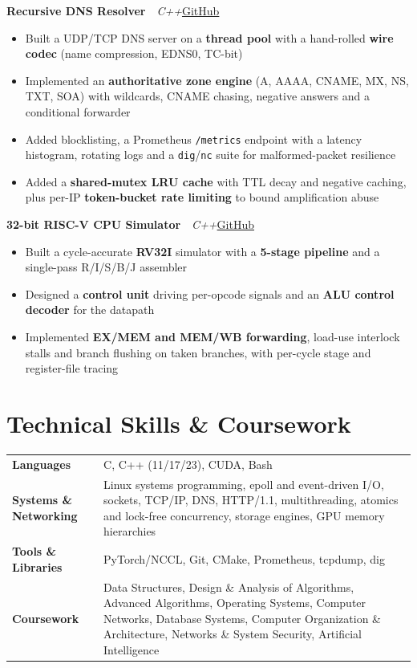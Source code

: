 \documentclass[10pt,a4paper]{article}
\newcommand{\lnk}[2]{\href{#1}{\color{accent}#2}}
\newcommand{\project}[3]{\vspace{5pt}\textbf{#1}\ \ {\small\textit{#2}}\hfill{\small #3}\vspace{-1pt}}
\begin{document}
\project{Recursive DNS Resolver}{C++}{\lnk{https://github.com/Adityaa-Saha17/DNS-Implementation}{GitHub}}
\begin{itemize}
  \item Built a UDP/TCP DNS server on a \textbf{thread pool} with a hand-rolled \textbf{wire codec} (name compression, EDNS0, TC-bit)
  \item Implemented an \textbf{authoritative zone engine} (A, AAAA, CNAME, MX, NS, TXT, SOA) with wildcards, CNAME chasing, negative answers and a conditional forwarder
  \item Added blocklisting, a Prometheus \texttt{/metrics} endpoint with a latency histogram, rotating logs and a \texttt{dig}/\texttt{nc} suite for malformed-packet resilience
  \item Added a \textbf{shared-mutex LRU cache} with TTL decay and negative caching, plus per-IP \textbf{token-bucket rate limiting} to bound amplification abuse
\end{itemize}

\project{32-bit RISC-V CPU Simulator}{C++}{\lnk{https://github.com/Adityaa-Saha17/32-bit-RISC-V-CPU-Simulator}{GitHub}}
\begin{itemize}
  \item Built a cycle-accurate \textbf{RV32I} simulator with a \textbf{5-stage pipeline} and a single-pass R/I/S/B/J assembler
  \item Designed a \textbf{control unit} driving per-opcode signals and an \textbf{ALU control decoder} for the datapath
  \item Implemented \textbf{EX/MEM and MEM/WB forwarding}, load-use interlock stalls and branch flushing on taken branches, with per-cycle stage and register-file tracing
\end{itemize}

\section{Technical Skills \& Coursework}
{\small
\begin{tabularx}{\linewidth}{@{}l X@{}}
\textbf{Languages} & C, C++ (11/17/23), CUDA, Bash \\
\textbf{Systems \& Networking} & Linux systems programming, epoll and event-driven I/O, sockets, TCP/IP, DNS, HTTP/1.1, multithreading, atomics and lock-free concurrency, storage engines, GPU memory hierarchies \\
\textbf{Tools \& Libraries} & PyTorch/NCCL, Git, CMake, Prometheus, tcpdump, dig \\
\textbf{Coursework} & Data Structures, Design \& Analysis of Algorithms, Advanced Algorithms, Operating Systems, Computer Networks, Database Systems, Computer Organization \& Architecture, Networks \& System Security, Artificial Intelligence \\
\end{tabularx}}
\end{document}
